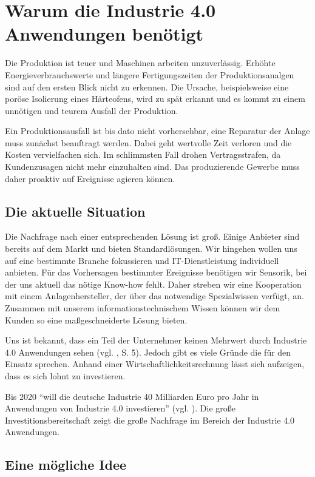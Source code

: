 \section{Warum die Industrie 4.0 Anwendungen benötigt}

Die Produktion ist teuer und Maschinen arbeiten unzuverlässig. Erhöhte Energieverbrauchswerte und längere Fertigungszeiten der Produktionsanalgen sind auf den ersten Blick nicht zu erkennen. Die Ursache, beispielsweise eine poröse Isolierung eines Härteofens, wird zu spät erkannt und es kommt zu einem unnötigen und teurem Ausfall der Produktion.

Ein Produktionsausfall ist bis dato nicht vorhersehbar, eine Reparatur der Anlage muss zunächst beauftragt werden. Dabei geht wertvolle Zeit verloren und die Kosten vervielfachen sich. Im schlimmsten Fall drohen Vertragsstrafen, da Kundenzusagen nicht mehr einzuhalten sind. Das produzierende Gewerbe muss daher proaktiv auf Ereignisse agieren können. 


\subsection{Die aktuelle Situation}
Die Nachfrage nach einer entsprechenden Lösung ist groß. Einige Anbieter sind bereits auf dem Markt und bieten Standardlösungen. Wir hingehen wollen uns auf eine bestimmte Branche fokussieren und IT-Dienstleistung individuell anbieten. Für das Vorhersagen bestimmter Ereignisse benötigen wir Sensorik, bei der uns aktuell das nötige Know-how fehlt. Daher streben wir eine Kooperation mit einem Anlagenhersteller, der über das notwendige Spezialwissen verfügt, an. Zusammen mit unserem informationstechnischem Wissen können wir dem Kunden so eine maßgeschneiderte Lösung bieten.

Uns ist bekannt, dass ein Teil der Unternehmer keinen Mehrwert durch Industrie 4.0 Anwendungen sehen (vgl. \cite{SasForsa}, S. 5). Jedoch gibt es viele Gründe die für den Einsatz sprechen. Anhand einer Wirtschaftlichkeitsrechnung lässt sich aufzeigen, dass es sich lohnt zu investieren.

Bis 2020 "`will die deutsche Industrie 40 Milliarden Euro pro Jahr in Anwendungen von Industrie 4.0 investieren"' (vgl. \cite{IndustrieHohesPotenzial}). Die große Investitionsbereitschaft zeigt die große Nachfrage im Bereich der Industrie 4.0 Anwendungen. 

\subsection{Eine mögliche Idee}


